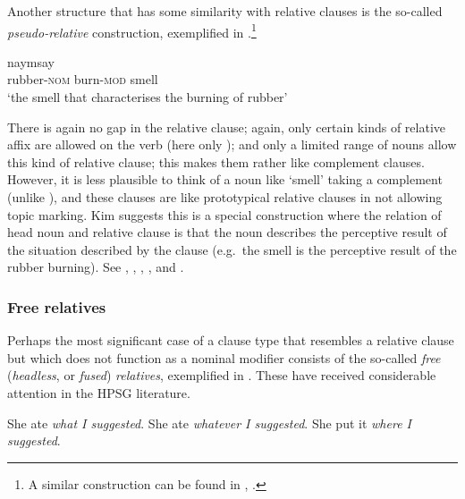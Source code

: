 \documentclass[output=paper,biblatex,babelshorthands,newtxmath,draftmode,colorlinks,citecolor=brown]{langscibook}
\begin{document}
Another  structure that has some similarity with relative clauses is the so-called
\emph{pseudo-relative} construction, exemplified in .\footnote{A similar
  construction can be found in , \citep[cf.][]{kikuta1998multiple,kikuta2001japanese,Kikuta2002a-u,Chan:Kim:03}.}
\begin{exe}\ex\label{x:rc-136}
  naymsay\\
      \hphantom{[}rubber-\textsc{nom} burn-\textsc{mod} smell\\
      \glt `the smell that characterises the burning of rubber' 
\end{exe}

\largerpage
\noindent
There is again no gap in the relative clause; again, only certain kinds of relative
affix are allowed on the verb (here only ); and only a limited range of nouns allow this kind
of relative clause; this makes them rather like complement clauses.  However, it is less
plausible to think of a noun like  `smell' taking a complement (unlike
), and these clauses are like prototypical relative clauses in not allowing topic
marking. Kim suggests this is
a special construction where the relation of head noun and relative clause is that the
noun describes the perceptive result of the situation described by the clause (e.g.\ the
smell is the perceptive result of the rubber burning). See 
, , , , and .

\subsubsection{Free relatives}
\label{sec:rc-free-relatives}

Perhaps the most significant case of a clause type that resembles a relative clause but
which does not function as a nominal modifier consists of the so-called \emph{free}
(\emph{headless}, or \emph{fused}) \emph{relatives}, exemplified in . These
have received considerable attention in the HPSG literature.
\begin{exe}\ex\begin{xlist}\label{x:rc-137}
    \ex\label{x:rc-138} She ate \emph{what I suggested}.
    \ex\label{x:rc-139} She ate \emph{whatever I suggested}.
    \ex\label{x:rc-140} She put it \emph{where I suggested}.
\end{xlist}\end{exe}
\end{document}
